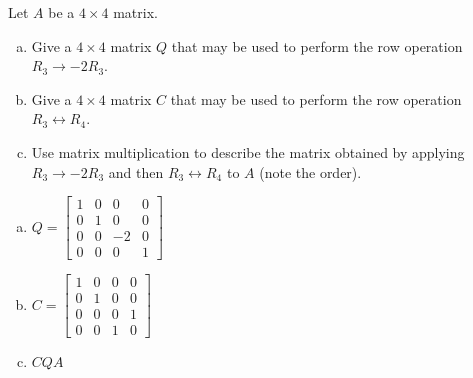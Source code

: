 
\begin{exerciseStatement}


Let \(A\) be a \(4 \times 4\) matrix.


\begin{enumerate}[(a)]
\item Give a \(4 \times 4\) matrix \(Q\) that may be used to perform the row operation \( R_3 \to -2R_3 \).
\item Give a \(4 \times 4\) matrix \(C\) that may be used to perform the row operation \( R_3 \leftrightarrow R_4 \).
\item Use matrix multiplication to describe the matrix obtained by applying \( R_3 \to -2R_3 \) and then \( R_3 \leftrightarrow R_4 \) to \(A\) (note the order). 
\end{enumerate}
    
\end{exerciseStatement}
    
\begin{exerciseAnswer} 

\begin{enumerate}[(a)]
\item \(Q= \left[\begin{array}{cccc}
1 & 0 & 0 & 0 \\
0 & 1 & 0 & 0 \\
0 & 0 & -2 & 0 \\
0 & 0 & 0 & 1
\end{array}\right] \)
\item \(C= \left[\begin{array}{cccc}
1 & 0 & 0 & 0 \\
0 & 1 & 0 & 0 \\
0 & 0 & 0 & 1 \\
0 & 0 & 1 & 0
\end{array}\right] \)
\item \(CQA\)
\end{enumerate}
    
\end{exerciseAnswer}
    
